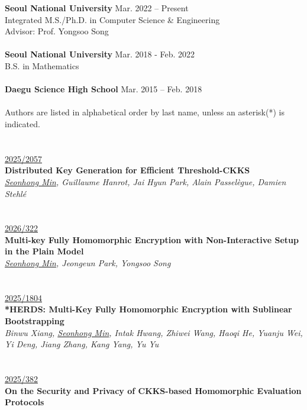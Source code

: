 \documentclass[a4paper, 10pt, twocolumn]{article}
\begin{document}
\textbf{Seoul National University} \hfill Mar. 2022 -- Present \\
Integrated M.S./Ph.D. in Computer Science \& Engineering \\
Advisor: Prof. Yongsoo Song \\
\\
\textbf{Seoul National University} \hfill Mar. 2018 - Feb. 2022 \\
B.S. in Mathematics \\
\\
\textbf{Daegu Science High School} \hfill Mar. 2015 -- Feb. 2018 \\
\\
Authors are listed in alphabetical order by last name, unless an asterisk(*) is indicated. \\
\\
 \\
 {\small \href{https://eprint.iacr.org/2025/2057}{2025/2057}}\\
\textbf{Distributed Key Generation for Efficient Threshold-CKKS}\\
\textit{\underline{Seonhong Min}, Guillaume Hanrot, Jai Hyun Park, Alain Passel\`egue, Damien Stehl\'e} \\
 \\
\\
 {\small \href{https://eprint.iacr.org/2026/322}{2026/322}}\\
\textbf{Multi-key Fully Homomorphic Encryption with Non-Interactive Setup in the Plain Model}\\
\textit{\underline{Seonhong Min}, Jeongeun Park, Yongsoo Song} \\
 \\
\\
 {\small \href{https://eprint.iacr.org/2025/1804}{2025/1804}}\\
\textbf{*HERDS: Multi-Key Fully Homomorphic Encryption with Sublinear Bootstrapping} \\
\textit{Binwu Xiang, \underline{Seonhong Min}, Intak Hwang, Zhiwei Wang, Haoqi He, Yuanju Wei, Yi Deng, Jiang Zhang, Kang Yang, Yu Yu} \\
 \\ 
\\
 {\small \href{https://eprint.iacr.org/2025/382}{2025/382}}\\
\textbf{On the Security and Privacy of CKKS-based Homomorphic Evaluation Protocols} \\
\end{document}
